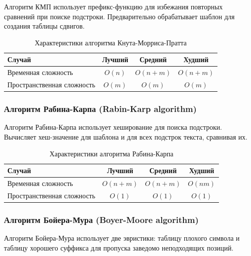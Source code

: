 \documentclass[a4paper,12pt]{article}
\begin{document}
Алгоритм КМП использует префикс-функцию для избежания повторных сравнений при поиске подстроки. Предварительно обрабатывает шаблон для создания таблицы сдвигов.

\begin{table}[H]
    \centering
    \begin{tabular}{|l|c|c|c|}
        \hline
        Случай & Лучший & Средний & Худший \\
        \hline
        Временная сложность & $O(n)$ & $O(n + m)$ & $O(n + m)$ \\
        \hline
        Пространственная сложность & $O(m)$ & $O(m)$ & $O(m)$ \\
        \hline
    \end{tabular}
    \caption{Характеристики алгоритма Кнута-Морриса-Пратта}
\end{table}

\subsubsection{Алгоритм Рабина-Карпа (Rabin-Karp algorithm)}
\label{subsubsec:алгоритм-рабина-карпа-rabin-karp-algorithm}

Алгоритм Рабина-Карпа использует хеширование для поиска подстроки. Вычисляет хеш-значение для шаблона и для всех подстрок текста, сравнивая их.

\begin{table}[H]
    \centering
    \begin{tabular}{|l|c|c|c|}
        \hline
        Случай & Лучший & Средний & Худший \\
        \hline
        Временная сложность & $O(n + m)$ & $O(n + m)$ & $O(nm)$ \\
        \hline
        Пространственная сложность & $O(1)$ & $O(1)$ & $O(1)$ \\
        \hline
    \end{tabular}
    \caption{Характеристики алгоритма Рабина-Карпа}
\end{table}

\subsubsection{Алгоритм Бойера-Мура (Boyer-Moore algorithm)}
\label{subsubsec:алгоритм-бойера-мура-boyer-moore-algorithm}

Алгоритм Бойера-Мура использует две эвристики: таблицу плохого символа и таблицу хорошего суффикса для пропуска заведомо неподходящих позиций.
\end{document}
